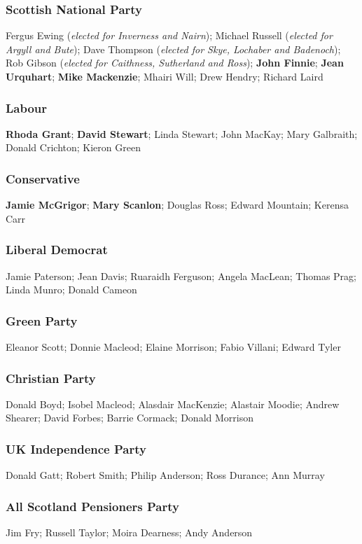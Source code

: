 \begin{resultsiii}
\subsubsection*{Scottish National Party}
Fergus Ewing (\emph{elected for Inverness and Nairn}); Michael Russell (\emph{elected for Argyll and Bute}); Dave Thompson (\emph{elected for Skye, Lochaber and Badenoch}); Rob Gibson (\emph{elected for Caithness, Sutherland and Ross}); \textbf{John Finnie}; \textbf{Jean Urquhart}; \textbf{Mike Mackenzie}; Mhairi Will; Drew Hendry; Richard Laird
\subsubsection*{Labour}
\textbf{Rhoda Grant}; \textbf{David Stewart}; Linda Stewart; John MacKay; Mary Galbraith; Donald Crichton; Kieron Green
\subsubsection*{Conservative}
\textbf{Jamie McGrigor}; \textbf{Mary Scanlon}; Douglas Ross; Edward Mountain; Kerensa Carr
\subsubsection*{Liberal Democrat}
Jamie Paterson; Jean Davis; Ruaraidh Ferguson; Angela MacLean; Thomas Prag; Linda Munro; Donald Cameon
\subsubsection*{Green Party}
Eleanor Scott; Donnie Macleod; Elaine Morrison; Fabio Villani; Edward Tyler
\subsubsection*{Christian Party}
Donald Boyd; Isobel Macleod; Alasdair MacKenzie; Alastair Moodie; Andrew Shearer; David Forbes; Barrie Cormack; Donald Morrison
\subsubsection*{UK Independence Party}
Donald Gatt; Robert Smith; Philip Anderson; Ross Durance; Ann Murray
\subsubsection*{All Scotland Pensioners Party}
Jim Fry; Russell Taylor; Moira Dearness; Andy Anderson

\end{resultsiii}
